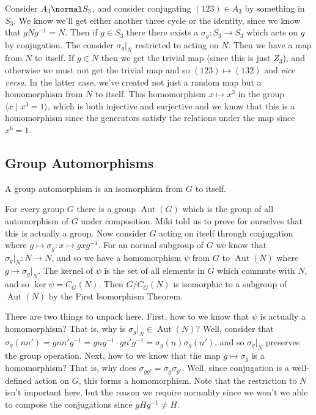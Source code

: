 \begin{example}
Consider $A_3 \normal S_3$, and consider conjugating $(123) \in A_3$ by something in $S_3$. We know we'll get either another three cycle or the identity, since we know that $gNg^{-1} = N$. Then if $g \in S_3$ there there exists a $\sigma_g : S_3 \to S_3$ which acts on $g$ by conjugation. The consider $\sigma_g |_N$ restricted to acting on $N$. Then we have a map from $N$ to itself. If $g \in N$ then we get the trivial map (since this is just $Z_3$), and otherwise we must not get the trivial map and so $(123) \mapsto (132)$ and \emph{vice versa}. In the latter case, we've created not just a random map but a homomorphism from $N$ to itself. This homomorphism $x \mapsto x^3$ in the group $\langle x \mid x^3 = 1 \rangle$, which is both injective and surjective and we know that this is a homomorphism since the generators satisfy the relations under the map since $x^6 = 1$.
\end{example}

\subsection{Group Automorphisms}

\begin{definition}[Automorphism]
A group automorphism is an isomorphism from $G$ to itself.
\end{definition}

For every group $G$ there is a group $\operatorname{Aut}(G)$ which is the group of all automorphism of $G$ under composition. Miki told us to prove for ourselves that this is actually a group. Now consider $G$ acting on itself through conjugation where $g \mapsto \sigma_g : x \mapsto gxg^{-1}$. For an normal subgroup of $G$ we know that $\sigma_g|_N : N \to N$, and so we have a homomorphism $\psi$ from $G$ to $\operatorname{Aut}(N)$ where $g \mapsto \sigma_g |_N$. The kernel of $\psi$ is the set of all elements in $G$ which commute with $N$, and so $\ker \psi = C_G(N)$. Then $G/C_G(N)$ is isomorphic to a subgroup of $\operatorname{Aut}(N)$ by the First Isomorphism Theorem.

There are two things to unpack here. First, how to we know that $\psi$ is actually a homomorphism? That is, why is $\sigma_g|_N \in \operatorname{Aut}(N)$? Well, consider that $\sigma_g(nn') = gnn'g^{-1} = gng^{-1} \cdot gn'g^{-1} = \sigma_g(n)\sigma_g(n')$, and so $\sigma_g |_N$ preserves the group operation. Next, how to we know that the map $g \mapsto \sigma_g$ is a homomorphism? That is, why does $\sigma_{gg'} = \sigma_{g}\sigma_{g'}$. Well, since conjugation is a well-defined action on $G$, this forms a homomorphism. Note that the restriction to $N$ isn't important here, but the reason we require normality since we won't we able to compose the conjugations since $gHg^{-1} \not= H$.

